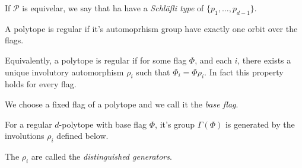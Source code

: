 \begin{definition}
  If $\mathcal P$ is equivelar, we say that ha have a \textit{Schläfli type} of $\{p_1, \dots, p_{d-1}\}$.
\end{definition}

\begin{definition}
  A polytope is regular if it's automoprhism group have exactly one orbit over the flags.
\end{definition}

\begin{property}
  Equivalently, a polytope is regular if for some flag $\Phi$, and each $i$, there exists a unique involutory automorphism $\rho_i$ such that $\Phi_i = \Phi \rho_i$. In fact this property holds for every flag.
\end{property}

\begin{definition}
  We choose a fixed flag of a polytope and we call it the \textit{base flag}.
\end{definition}

\begin{property}
  For a regular $d$-polytope with base flag $\Phi$, it's group $\Gamma(\Phi)$ is generated by the involutions $\rho_i$ defined below.
\end{property}

\begin{definition}
  The $\rho_i$ are called the \textit{distinguished generators}.
\end{definition}
